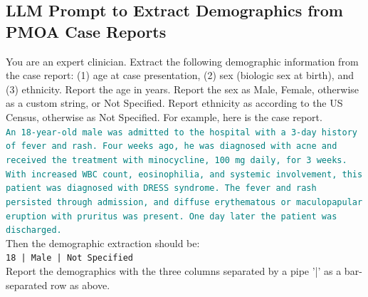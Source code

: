\subsection{LLM Prompt to Extract Demographics from PMOA Case Reports}
\label{apd:demographics-prompt}


\begin{tcolorbox}[
  colback=gray!5,
  colframe=gray!100,
  title={Prompt},
  boxrule=2pt,
  enhanced,
  breakable,                %
  before skip=8pt,          %
  after skip=8pt,           %
  pad at break*=2mm,        %
  fontupper=\scriptsize,
  title after break={{Prompt}} %
]
You are an expert clinician. Extract the following demographic information from the case report: (1) age at case presentation, (2) sex (biologic sex at birth), and (3) ethnicity.  Report the age in years.  Report the sex as Male, Female, otherwise as a custom string, or Not Specified.  Report ethnicity as according to the US Census, otherwise as Not Specified.  For example, here is the case report.\\

\textcolor{teal}{\texttt{An 18-year-old male was admitted to the hospital with a 3-day history of fever and rash. Four weeks ago, he was diagnosed with acne and received the treatment with minocycline, 100 mg daily, for 3 weeks. With increased WBC count, eosinophilia, and systemic involvement, this patient was diagnosed with DRESS syndrome. The fever and rash persisted through admission, and diffuse erythematous or maculopapular eruption with pruritus was present. One day later the patient was discharged.}}\\

Then the demographic extraction should be:\\
\texttt{18 | Male | Not Specified} \\
 
Report the demographics with the three columns separated by a pipe '|' as a bar-separated row as above.
\end{tcolorbox}